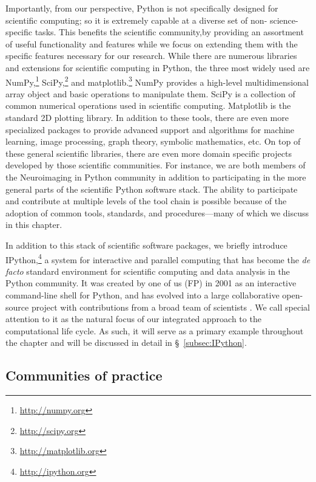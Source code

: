 \documentclass[11pt,oneside,english]{article}
\begin{document}
Importantly, from our perspective, Python is not specifically designed for
scientific computing;  so it is extremely capable at a diverse set of non-
science-specific tasks. This benefits the scientific community,by providing an
assortment of useful functionality and features while we focus on extending
them with the specific features necessary for our research.  While there are
numerous libraries and extensions for scientific computing in Python, the three
most widely used are NumPy,\footnote{\url{http://numpy.org}}
SciPy,\footnote{\url{http://scipy.org}} and
matplotlib.\footnote{\url{http://matplotlib.org}}  NumPy \cite{van2011numpy}
provides a high-level multidimensional array object and basic operations to
manipulate them. SciPy is a collection of common numerical operations used in
scientific computing.  Matplotlib \cite{hunter2007matplotlib,
hunter2012matplotlib} is the standard 2D plotting library. In addition to these
tools, there are even more specialized packages to provide advanced support and
algorithms for machine learning, image processing, graph theory, symbolic
mathematics, etc. On top of these general scientific libraries, there are even
more domain specific projects developed by those scientific communities. For
instance, we are both members of the Neuroimaging in Python \cite{MIL-BRE:2007}
community in addition to participating in the more general parts of the
scientific Python software stack. The ability to participate and contribute at
multiple levels of the tool chain is possible because of the adoption of common
tools, standards, and procedures---many of which we discuss in this chapter.

In addition to this stack of scientific software packages, we briefly
introduce IPython,\footnote{\url{http://ipython.org}} a system for interactive
and parallel computing that has become the \emph{de facto} standard environment
for scientific computing and data analysis in the Python community.  It was
created by one of us (FP) in 2001 as an interactive command-line shell for
Python, and has evolved into a large collaborative open-source project with
contributions from a broad team of scientists \cite{PER-GRA:2007}. We call
special attention to it as the natural focus of our integrated approach to the
computational life cycle. As such, it will serve as a primary example
throughout the chapter and will be discussed in detail in §~\ref{subsec:IPython}.

\subsection{\label{subsec:community}Communities of practice}
\end{document}
